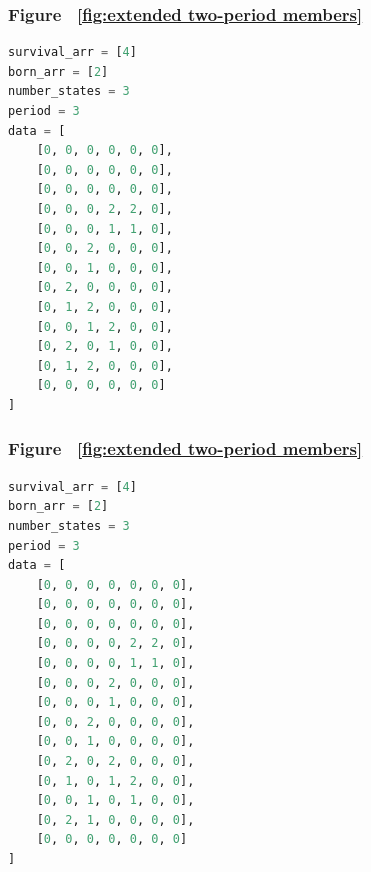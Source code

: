 \documentclass[12pt]{article}
\numberwithin{figure}{section} %
\begin{document}
\noindent\begin{minipage}{.45\textwidth}
\subsubsection{Figure ~\ref{fig:extended two-period members}}
\label{subsubsection:extended two-period members(2/5)}
\begin{lstlisting}[language = Python]
survival_arr = [4]
born_arr = [2]
number_states = 3
period = 3
data = [
    [0, 0, 0, 0, 0, 0],
    [0, 0, 0, 0, 0, 0],
    [0, 0, 0, 0, 0, 0],
    [0, 0, 0, 2, 2, 0],
    [0, 0, 0, 1, 1, 0],
    [0, 0, 2, 0, 0, 0],
    [0, 0, 1, 0, 0, 0],
    [0, 2, 0, 0, 0, 0],
    [0, 1, 2, 0, 0, 0],
    [0, 0, 1, 2, 0, 0],
    [0, 2, 0, 1, 0, 0],
    [0, 1, 2, 0, 0, 0],
    [0, 0, 0, 0, 0, 0]
]
\end{lstlisting}
\end{minipage}\hfill
\begin{minipage}{.45\textwidth}
\subsubsection{Figure ~\ref{fig:extended two-period members}}
\label{subsubsection:extended two-period members(3/5)}
\begin{lstlisting}[language = Python]
survival_arr = [4]
born_arr = [2]
number_states = 3
period = 3
data = [
    [0, 0, 0, 0, 0, 0, 0],
    [0, 0, 0, 0, 0, 0, 0],
    [0, 0, 0, 0, 0, 0, 0],
    [0, 0, 0, 0, 2, 2, 0],
    [0, 0, 0, 0, 1, 1, 0],
    [0, 0, 0, 2, 0, 0, 0],
    [0, 0, 0, 1, 0, 0, 0],
    [0, 0, 2, 0, 0, 0, 0],
    [0, 0, 1, 0, 0, 0, 0],
    [0, 2, 0, 2, 0, 0, 0],
    [0, 1, 0, 1, 2, 0, 0],
    [0, 0, 1, 0, 1, 0, 0],
    [0, 2, 1, 0, 0, 0, 0],
    [0, 0, 0, 0, 0, 0, 0]
]
\end{lstlisting}
\end{minipage}
\end{document}
